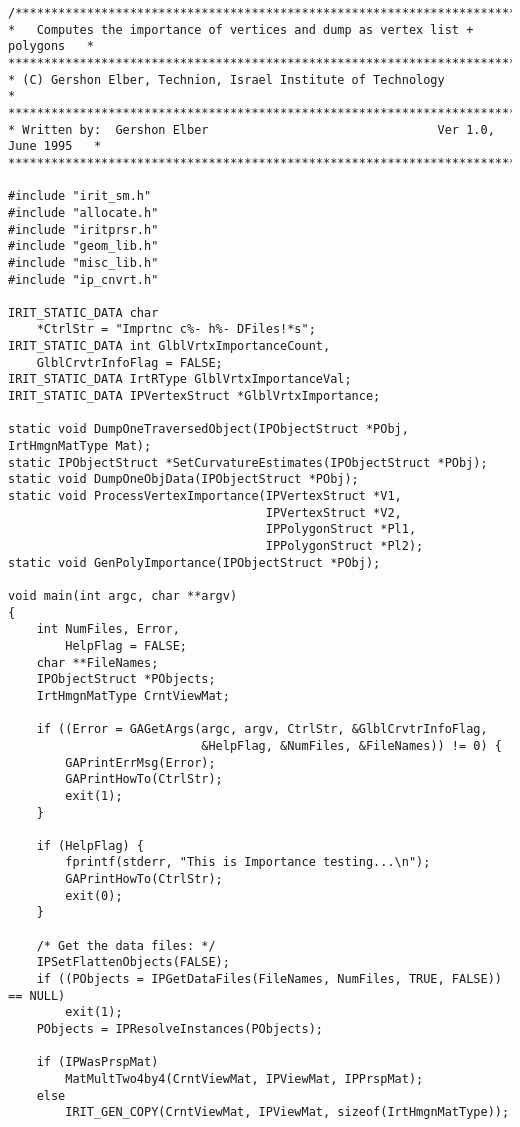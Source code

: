 \begin{verbatim}
/*****************************************************************************
*   Computes the importance of vertices and dump as vertex list + polygons   *
******************************************************************************
* (C) Gershon Elber, Technion, Israel Institute of Technology                *
******************************************************************************
* Written by:  Gershon Elber                                Ver 1.0, June 1995   *
*****************************************************************************/

#include "irit_sm.h"
#include "allocate.h"
#include "iritprsr.h"
#include "geom_lib.h"
#include "misc_lib.h"
#include "ip_cnvrt.h"

IRIT_STATIC_DATA char
    *CtrlStr = "Imprtnc c%- h%- DFiles!*s";
IRIT_STATIC_DATA int GlblVrtxImportanceCount,
    GlblCrvtrInfoFlag = FALSE;
IRIT_STATIC_DATA IrtRType GlblVrtxImportanceVal;
IRIT_STATIC_DATA IPVertexStruct *GlblVrtxImportance;

static void DumpOneTraversedObject(IPObjectStruct *PObj, IrtHmgnMatType Mat);
static IPObjectStruct *SetCurvatureEstimates(IPObjectStruct *PObj);
static void DumpOneObjData(IPObjectStruct *PObj);
static void ProcessVertexImportance(IPVertexStruct *V1,
                                    IPVertexStruct *V2,
                                    IPPolygonStruct *Pl1,
                                    IPPolygonStruct *Pl2);
static void GenPolyImportance(IPObjectStruct *PObj);

void main(int argc, char **argv)
{
    int NumFiles, Error,
        HelpFlag = FALSE;
    char **FileNames;
    IPObjectStruct *PObjects;
    IrtHmgnMatType CrntViewMat;

    if ((Error = GAGetArgs(argc, argv, CtrlStr, &GlblCrvtrInfoFlag,
                           &HelpFlag, &NumFiles, &FileNames)) != 0) {
        GAPrintErrMsg(Error);
        GAPrintHowTo(CtrlStr);
        exit(1);
    }

    if (HelpFlag) {
        fprintf(stderr, "This is Importance testing...\n");
        GAPrintHowTo(CtrlStr);
        exit(0);
    }

    /* Get the data files: */
    IPSetFlattenObjects(FALSE);
    if ((PObjects = IPGetDataFiles(FileNames, NumFiles, TRUE, FALSE)) == NULL)
        exit(1);
    PObjects = IPResolveInstances(PObjects);

    if (IPWasPrspMat)
        MatMultTwo4by4(CrntViewMat, IPViewMat, IPPrspMat);
    else
        IRIT_GEN_COPY(CrntViewMat, IPViewMat, sizeof(IrtHmgnMatType));


\end{verbatim}
